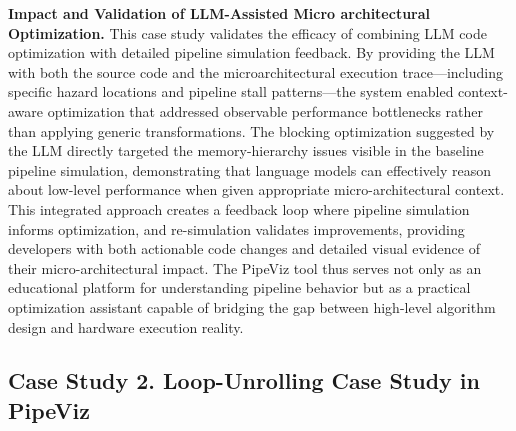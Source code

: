 \textbf{Impact and Validation of LLM-Assisted Micro architectural Optimization.} This case study validates the efficacy of combining LLM code optimization with detailed pipeline simulation feedback. By providing the LLM with both the source code and the microarchitectural execution trace—including specific hazard locations and pipeline stall patterns—the system enabled context-aware optimization that addressed observable performance bottlenecks rather than applying generic transformations. The blocking optimization suggested by the LLM directly targeted the memory-hierarchy issues visible in the baseline pipeline simulation, demonstrating that language models can effectively reason about low-level performance when given appropriate micro-architectural context. This integrated approach creates a feedback loop where pipeline simulation informs optimization, and re-simulation validates improvements, providing developers with both actionable code changes and detailed visual evidence of their micro-architectural impact. The PipeViz tool thus serves not only as an educational platform for understanding pipeline behavior but as a practical optimization assistant capable of bridging the gap between high-level algorithm design and hardware execution reality.


\subsection*{Case Study 2. Loop-Unrolling Case Study in PipeViz}





